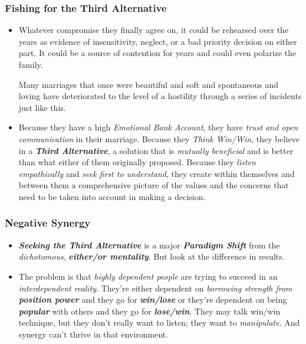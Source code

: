 \documentclass[11pt]{article}
\begin{document}
\subsubsection{Fishing for the Third Alternative}
\begin{itemize}
\item Whatever compromise they finally agree on, it could be rehearsed over the years as evidence of insensitivity, neglect, or a bad priority decision on either part. It could be a source of contention for years and could even polarize the family. 

Many marriages that once were beautiful and soft and spontaneous and loving have deteriorated to the level of a hostility through a series of incidents just like this.

\item Because they have a high \emph{Emotional Bank Account}, they have \emph{trust and open communication} in their marriage. Because they \emph{Think Win/Win}, they believe in a \emph{\textbf{Third Alternative}}, a solution that is \emph{mutually beneficial} and is better than what either of them originally proposed. Because they \emph{listen empathically} and \emph{seek first to understand}, they create within themselves and between them a comprehensive picture of the values and the concerns that need to be taken into account in making a decision.
\end{itemize}

\subsubsection{Negative Synergy}
\begin{itemize}
\item \emph{\textbf{Seeking the Third Alternative}} is a major \emph{\textbf{Paradigm Shift}} from the \emph{dichotomous}, \emph{\textbf{either/or mentality}}. But look at the difference in results.

\item The problem is that \emph{highly dependent people} are trying to succeed in an \emph{interdependent reality}. They're either dependent on \emph{borrowing strength from \textbf{position power}} and they go for \emph{\textbf{win/lose}} or they're dependent on being \emph{\textbf{popular}} with others and they go for \emph{\textbf{lose/win}}. They may talk win/win technique, but they don't really want to listen; they want to \emph{manipulate}. And synergy can't thrive in that environment.
\end{itemize}
\end{document}

